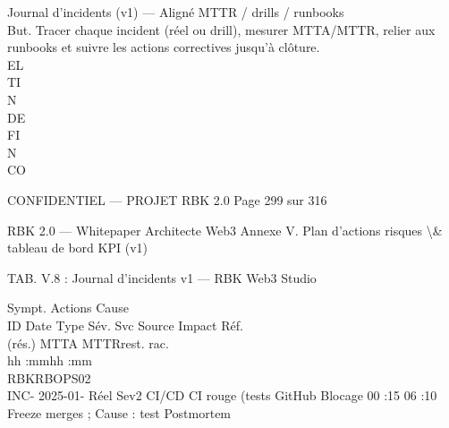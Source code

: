 Journal d’incidents (v1) — Aligné MTTR / drills / runbooks\\
But. Tracer chaque incident (réel ou drill), mesurer MTTA/MTTR, relier aux runbooks et suivre les actions correctives jusqu’à clôture.\\
\vspace{0.5em}
\vspace{0.5em}
\vspace{0.5em}
\vspace{0.5em}
EL\\
TI\\
N\\
DE\\
FI\\
N\\
CO\\
\vspace{0.5em}
\vspace{0.5em}
\vspace{0.5em}
\vspace{0.5em}
\begin{confidential}CONFIDENTIEL — PROJET RBK 2.0                                                             Page 299 sur 316\end{confidential}
RBK 2.0 — Whitepaper Architecte Web3                                                                     Annexe V. Plan d’actions risques \textbackslash{}& tableau de bord KPI (v1)\\
\vspace{0.5em}
\vspace{0.5em}
\begin{center}\begin{tabular}TAB. V.8 : Journal d’incidents v1 — RBK Web3 Studio\end{tabular}\end{center}
Sympt.                                                 Actions                  Cause\\
ID     Date     Type    Sév.    Svc                          Source    Impact                                                       Réf.\\
(rés.)                                        MTTA MTTRrest.                     rac.\\
hh :mmhh :mm\\
\vspace{0.5em}
RBKRBOPS02\\
INC- 2025-01- Réel      Sev2    CI/CD   CI rouge (tests      GitHub    Blocage       00 :15 06 :10 Freeze merges ;    Cause : test      Postmortem\\
